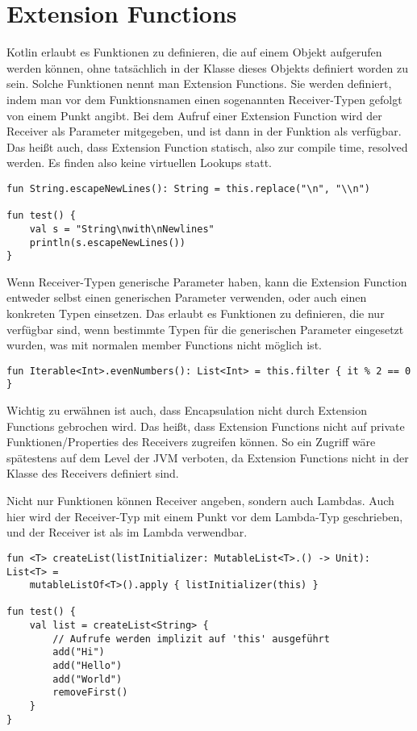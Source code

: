 
\section{Extension Functions}\label{sec:extension-functions}

\renewcommand{\kapitelautor}{Autor: Marvin Kurka}

Kotlin erlaubt es Funktionen zu definieren, die auf einem Objekt aufgerufen werden können, ohne tatsächlich in der
Klasse dieses Objekts definiert worden zu sein.
Solche Funktionen nennt man Extension Functions.
Sie werden definiert, indem man vor dem Funktionsnamen einen sogenannten Receiver-Typen gefolgt von einem Punkt angibt.
Bei dem Aufruf einer Extension Function wird der Receiver als Parameter mitgegeben, und ist dann in der Funktion als
 verfügbar.
Das heißt auch, dass Extension Function statisch, also zur compile time, resolved werden.
Es finden also keine virtuellen Lookups statt.\cite{kdocExtensions}

\begin{verbatim}
fun String.escapeNewLines(): String = this.replace("\n", "\\n")

fun test() {
    val s = "String\nwith\nNewlines"
    println(s.escapeNewLines())
}
\end{verbatim}

Wenn Receiver-Typen generische Parameter haben, kann die Extension Function entweder selbst einen generischen Parameter
verwenden, oder auch einen konkreten Typen einsetzen.
Das erlaubt es Funktionen zu definieren, die nur verfügbar sind, wenn bestimmte Typen für die generischen Parameter
eingesetzt wurden, was mit normalen member Functions nicht möglich ist.\cite{kdocExtensions}

\begin{verbatim}
fun Iterable<Int>.evenNumbers(): List<Int> = this.filter { it % 2 == 0 }
\end{verbatim}

Wichtig zu erwähnen ist auch, dass Encapsulation nicht durch Extension Functions gebrochen wird.
Das heißt, dass Extension Functions nicht auf private Funktionen/Properties des Receivers zugreifen können.
So ein Zugriff wäre spätestens auf dem Level der JVM verboten, da Extension Functions nicht in der Klasse des Receivers
definiert sind.

Nicht nur Funktionen können Receiver angeben, sondern auch Lambdas.
Auch hier wird der Receiver-Typ mit einem Punkt vor dem Lambda-Typ geschrieben, und der Receiver ist als
 im Lambda verwendbar.\cite{kdocLambdas}

\begin{verbatim}
fun <T> createList(listInitializer: MutableList<T>.() -> Unit): List<T> =
    mutableListOf<T>().apply { listInitializer(this) }

fun test() {
    val list = createList<String> {
        // Aufrufe werden implizit auf 'this' ausgeführt
        add("Hi")
        add("Hello")
        add("World")
        removeFirst()
    }
}
\end{verbatim}

\renewcommand{\kapitelautor}{}
